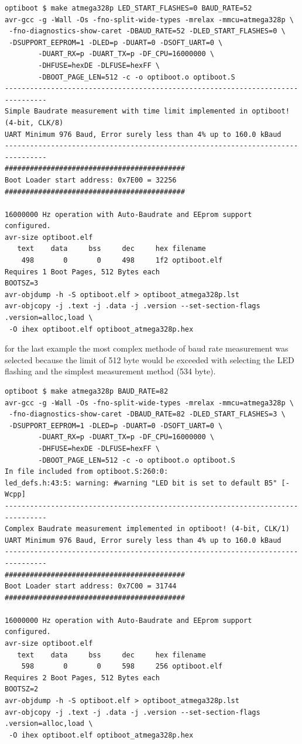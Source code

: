 \begin{verbatim}
optiboot $ make atmega328p LED_START_FLASHES=0 BAUD_RATE=52
avr-gcc -g -Wall -Os -fno-split-wide-types -mrelax -mmcu=atmega328p \
 -fno-diagnostics-show-caret -DBAUD_RATE=52 -DLED_START_FLASHES=0 \
 -DSUPPORT_EEPROM=1 -DLED=p -DUART=0 -DSOFT_UART=0 \
        -DUART_RX=p -DUART_TX=p -DF_CPU=16000000 \
        -DHFUSE=hexDE -DLFUSE=hexFF \
        -DBOOT_PAGE_LEN=512 -c -o optiboot.o optiboot.S
--------------------------------------------------------------------------------
Simple Baudrate measurement with time limit implemented in optiboot! (4-bit, CLK/8)
UART Minimum 976 Baud, Error surely less than 4% up to 160.0 kBaud
--------------------------------------------------------------------------------
###########################################
Boot Loader start address: 0x7E00 = 32256
###########################################

16000000 Hz operation with Auto-Baudrate and EEprom support configured.
avr-size optiboot.elf
   text	   data	    bss	    dec	    hex	filename
    498	      0	      0	    498	    1f2	optiboot.elf
Requires 1 Boot Pages, 512 Bytes each
BOOTSZ=3
avr-objdump -h -S optiboot.elf > optiboot_atmega328p.lst
avr-objcopy -j .text -j .data -j .version --set-section-flags .version=alloc,load \
 -O ihex optiboot.elf optiboot_atmega328p.hex
\end{verbatim}


for the last example the most complex methode of baud rate measurement
was selected because the limit of 512 byte would be exceeded with
selecting the LED flashing and the simplest measurement method (534 byte).

\begin{verbatim}
optiboot $ make atmega328p BAUD_RATE=82
avr-gcc -g -Wall -Os -fno-split-wide-types -mrelax -mmcu=atmega328p \
 -fno-diagnostics-show-caret -DBAUD_RATE=82 -DLED_START_FLASHES=3 \
 -DSUPPORT_EEPROM=1 -DLED=p -DUART=0 -DSOFT_UART=0 \
        -DUART_RX=p -DUART_TX=p -DF_CPU=16000000 \
        -DHFUSE=hexDE -DLFUSE=hexFF \
        -DBOOT_PAGE_LEN=512 -c -o optiboot.o optiboot.S
In file included from optiboot.S:260:0:
led_defs.h:43:5: warning: #warning "LED bit is set to default B5" [-Wcpp]
--------------------------------------------------------------------------------
Complex Baudrate measurement implemented in optiboot! (4-bit, CLK/1)
UART Minimum 976 Baud, Error surely less than 4% up to 160.0 kBaud
--------------------------------------------------------------------------------
###########################################
Boot Loader start address: 0x7C00 = 31744
###########################################

16000000 Hz operation with Auto-Baudrate and EEprom support configured.
avr-size optiboot.elf
   text	   data	    bss	    dec	    hex	filename
    598	      0	      0	    598	    256	optiboot.elf
Requires 2 Boot Pages, 512 Bytes each
BOOTSZ=2
avr-objdump -h -S optiboot.elf > optiboot_atmega328p.lst
avr-objcopy -j .text -j .data -j .version --set-section-flags .version=alloc,load \
 -O ihex optiboot.elf optiboot_atmega328p.hex
\end{verbatim}


